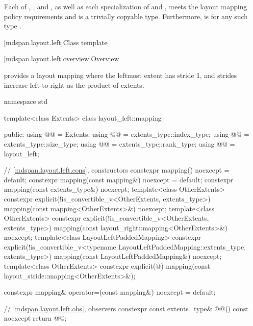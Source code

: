 \pnum
Each of , , and ,
as well as each specialization of
 and ,
meets the layout mapping policy requirements and is a trivially copyable type.
Furthermore,
 is 
for any such type .

[mdspan.layout.left]{Class template }

[mdspan.layout.left.overview]{Overview}

\pnum
{} provides a layout mapping
where the leftmost extent has stride 1, and
strides increase left-to-right as the product of extents.

%
\begin{codeblock}
namespace std {
  template<class Extents>
  class layout_left::mapping {
  public:
    using @@ = Extents;
    using @@ = extents_type::index_type;
    using @@ = extents_type::size_type;
    using @@ = extents_type::rank_type;
    using @@ = layout_left;

    // \ref{mdspan.layout.left.cons}, constructors
    constexpr mapping() noexcept = default;
    constexpr mapping(const mapping&) noexcept = default;
    constexpr mapping(const extents_type&) noexcept;
    template<class OtherExtents>
      constexpr explicit(!is_convertible_v<OtherExtents, extents_type>)
        mapping(const mapping<OtherExtents>&) noexcept;
    template<class OtherExtents>
      constexpr explicit(!is_convertible_v<OtherExtents, extents_type>)
        mapping(const layout_right::mapping<OtherExtents>&) noexcept;
    template<class LayoutLeftPaddedMapping>
      constexpr explicit(!is_convertible_v<typename LayoutLeftPaddedMapping::extents_type,
                                           extents_type>)
        mapping(const LayoutLeftPaddedMapping&) noexcept;
    template<class OtherExtents>
      constexpr explicit(@\seebelow@)
        mapping(const layout_stride::mapping<OtherExtents>&);

    constexpr mapping& operator=(const mapping&) noexcept = default;

    // \ref{mdspan.layout.left.obs}, observers
    constexpr const extents_type& @@() const noexcept { return @@; }

}}
\end{codeblock}
